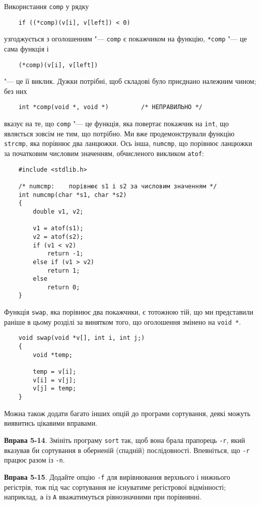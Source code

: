 \documentclass[a4paper,12pt]{book}
\begin{document}
  Використання \texttt{comp} у рядку
  \begin{verbatim}
    if ((*comp)(v[i], v[left]) < 0)
  \end{verbatim}
  узгоджується з оголошенням "--- \texttt{comp} є покажчиком на функцію, \texttt{*comp}
  "--- це сама функція і
  \begin{verbatim}
    (*comp)(v[i], v[left])
  \end{verbatim}
  "--- це її виклик. Дужки потрібні, щоб складові було приєднано належним чином; без них
  \begin{verbatim}
    int *comp(void *, void *)         /* НЕПРАВИЛЬНО */
  \end{verbatim}
  вказує на те, що \texttt{comp} "--- це функція, яка повертає покажчик на
  \texttt{int}, що являється зовсім не тим, що потрібно. Ми вже продемонстрували функцію
  \texttt{strcmp}, яка порівнює два ланцюжки. Ось інша, \texttt{numcmp}, що порівнює
  ланцюжки за початковим числовим значенням, обчисленого викликом \texttt{atof}:
  \begin{verbatim}
    #include <stdlib.h>

    /* numcmp:    порівнює s1 і s2 за числовим значенням */
    int numcmp(char *s1, char *s2)
    {
        double v1, v2;

        v1 = atof(s1);
        v2 = atof(s2);
        if (v1 < v2)
            return -1;
        else if (v1 > v2)
            return 1;
        else
            return 0;
    }
  \end{verbatim}

  Функція \texttt{swap}, яка порівнює два покажчики, є тотожною тій, що ми представили
  раніше в цьому розділі за винятком того, що оголошення змінено на \texttt{void *}.

  \begin{verbatim}
    void swap(void *v[], int i, int j;)
    {
        void *temp;

        temp = v[i];
        v[i] = v[j];
        v[j] = temp;
    }
  \end{verbatim}

  Можна також додати багато інших опцій до програми сортування, деякі можуть виявитись
  цікавими вправами.

  \textbf{Вправа 5-14}. Змініть програму \texttt{sort} так, щоб вона брала прапорець
  \texttt{-r}, який вказував би сортування в оберненій (спадній) послідовності.
  Впевніться, що \texttt{-r} працює разом із \texttt{-n}.

  \textbf{Вправа 5-15}. Додайте опцію \texttt{-f} для вирівнювання верхнього і нижнього
  регістрів, тож під час сортування не існуватиме регістрової відмінності; наприклад,
  \texttt{a} із \texttt{A} вважатимуться рівнозначними при порівнянні.
\end{document}
